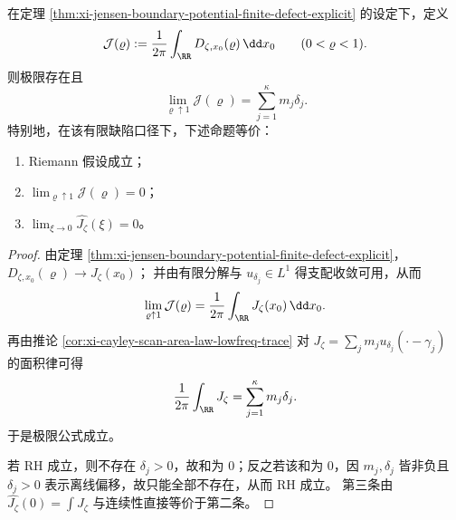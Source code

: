 \begin{theorem}\label{thm:xi-finite-defect-rh-criterion-jensen-scan-trace}
在定理 \ref{thm:xi-jensen-boundary-potential-finite-defect-explicit} 的设定下，定义
\[
\mathcal J(\varrho):=\frac{1}{2\pi}\int_{\RR}D_{\zeta,x_0}(\varrho)\,\dd x_0\qquad(0<\varrho<1).
\]
则极限存在且
\[
\lim_{\varrho\uparrow 1}\mathcal J(\varrho)=\sum_{j=1}^{\kappa}m_j\delta_j.
\]
特别地，在该有限缺陷口径下，下述命题等价：
\begin{enumerate}
  \item Riemann 假设成立；
  \item \(\displaystyle \lim_{\varrho\uparrow 1}\mathcal J(\varrho)=0\)；
  \item \(\displaystyle \lim_{\xi\to 0}\widehat{J_\zeta}(\xi)=0\)。
\end{enumerate}
\end{theorem}
\begin{proof}
由定理 \ref{thm:xi-jensen-boundary-potential-finite-defect-explicit}，
\(D_{\zeta,x_0}(\varrho)\to J_\zeta(x_0)\)；
并由有限分解与 \(u_{\delta_j}\in L^1\) 得支配收敛可用，从而
\[
\lim_{\varrho\uparrow 1}\mathcal J(\varrho)
=\frac{1}{2\pi}\int_{\RR}J_\zeta(x_0)\,\dd x_0.
\]
再由推论 \ref{cor:xi-cayley-scan-area-law-lowfreq-trace} 对 \(J_\zeta=\sum_j m_j u_{\delta_j}(\cdot-\gamma_j)\) 的面积律可得
\[
\frac{1}{2\pi}\int_{\RR}J_\zeta=\sum_{j=1}^{\kappa}m_j\delta_j.
\]
于是极限公式成立。

若 RH 成立，则不存在 \(\delta_j>0\)，故和为 \(0\)；反之若该和为 \(0\)，因 \(m_j,\delta_j\) 皆非负且 \(\delta_j>0\) 表示离线偏移，故只能全部不存在，从而 RH 成立。
第三条由 \(\widehat{J_\zeta}(0)=\int J_\zeta\) 与连续性直接等价于第二条。
\end{proof}

